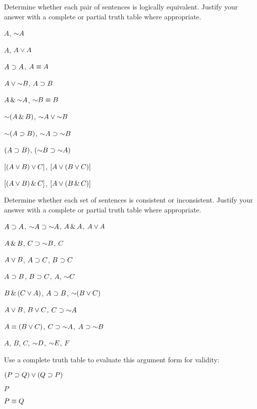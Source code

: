 \solutions
\problempart
\label{pr.TT.equiv}
Determine whether each pair of sentences is logically equivalent. Justify your answer with a complete or partial truth table where appropriate.
\begin{earg}
\item $A$, $\enot A$ %
\item $A$, $A \vee A$ %
\item $A\supset A$, $A \equiv A$ %
\item $A \eor \enot B$, $A\supset B$ %
\item $A \eand \enot A$, $\enot B \eiff B$ %
\item $\enot(A \eand B)$, $\enot A \eor \enot B$ %
\item $\enot(A \eif B)$, $\enot A \eif \enot B$ %
\item $(A \supset B)$, $(\enot B \eif \enot A)$ %
\item $[(A \vee B) \vee C]$, $[A \vee (B \vee C)]$ %
\item $[(A \vee B) \,\&\, C]$, $[A \vee (B \,\&\, C)]$ %
\end{earg}

\solutions
\problempart
\label{pr.TT.consistent}
Determine whether each set of sentences is consistent or inconsistent. Justify your answer with a complete or partial truth table where appropriate.
\begin{earg}
\item $A\supset A$, $\enot A \eif \enot A$, $A\,\&\, A$, $A\vee A$ %
\item $A \,\&\, B$, $C\eif \enot B$, $C$ %
\item $A\vee B$, $A\supset C$, $B\supset C$ %
\item $A\supset B$, $B\supset C$, $A$, $\enot C$ %
\item $B\,\&\,(C\vee A)$, $A\supset B$, $\enot(B\eor C)$  %
\item $A \vee B$, $B\vee C$, $C\eif \enot A$ %
\item $A\equiv(B\vee C)$, $C\eif \enot A$, $A\eif \enot B$ %
\item $A$, $B$, $C$, $\enot D$, $\enot E$, $F$ %
\end{earg}




\problempart
\label{HW3.B}

Use a complete truth table to evaluate this argument form for validity:

\begin{earg}
\item[] $(P \supset Q) \vee (Q \supset P)$
\item[] $P$
\item[\therefore] $P\equiv Q$
\end{earg}

